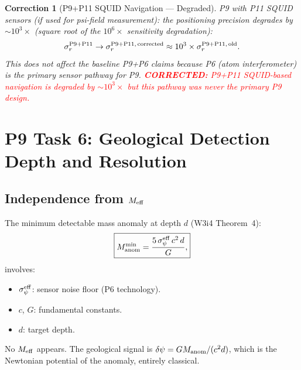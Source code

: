 \documentclass[aps,prd,twocolumn,superscriptaddress,nofootinbib]{revtex4-2}
\newcommand{\corrected}[1]{\textcolor{red}{\textbf{CORRECTED:} #1}}
\newtheorem{correction}{Correction}
\begin{document}
\begin{correction}[P9+P11 SQUID Navigation --- Degraded]
\label{corr:p9-p11}
P9 with P11 SQUID sensors (if used for psi-field measurement):
the positioning precision degrades by $\sim 10^3\times$
(square root of the $10^6\times$ sensitivity degradation):
\begin{equation}
\sigma_r^{\rm P9+P11} \to \sigma_r^{\rm P9+P11,\,corrected}
\approx 10^3 \times \sigma_r^{\rm P9+P11,\,old}.
\end{equation}
This does not affect the baseline P9+P6 claims because P6
(atom interferometer) is the primary sensor pathway for P9.
\corrected{P9+P11 SQUID-based navigation is degraded by $\sim 10^3\times$
but this pathway was never the primary P9 design.}
\end{correction}

\section{P9 Task 6: Geological Detection Depth and Resolution}
\label{sec:geological}

\subsection{Independence from $M_{\rm eff}$}

The minimum detectable mass anomaly at depth $d$ (W3i4 Theorem~4):
\begin{equation}
\boxed{
M_{\rm anom}^{\min} = \frac{5\,\sigma_\psi^{\rm eff}\,c^2\,d}{G},
}
\label{eq:min-mass}
\end{equation}
involves:
\begin{itemize}
\item $\sigma_\psi^{\rm eff}$: sensor noise floor (P6 technology).
\item $c$, $G$: fundamental constants.
\item $d$: target depth.
\end{itemize}
No $M_{\rm eff}$ appears. The geological signal is $\delta\psi = G M_{\rm anom}/(c^2 d)$,
which is the Newtonian potential of the anomaly, entirely classical.
\end{document}
